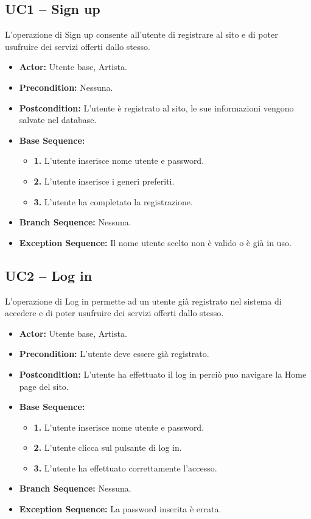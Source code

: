 \subsection{\textbf{UC1 -- Sign up}}
L'operazione di Sign up consente all'utente di registrare al sito 
e di poter usufruire dei servizi offerti dallo stesso. 
\begin{itemize}
    \item \textbf{Actor:} Utente base, Artista.
    \item \textbf{Precondition:} Nessuna.
    \item \textbf{Postcondition:} L'utente è registrato al sito, le sue informazioni vengono salvate nel database.
    \item \textbf{Base Sequence:} 
        \begin{itemize}
            \item \textbf{1.} L'utente inserisce nome utente e password.
            \item \textbf{2.} L'utente inserisce i generi preferiti.
            \item \textbf{3.} L'utente ha completato la registrazione.
        \end{itemize}
    \item \textbf{Branch Sequence:} Nessuna.
    \item \textbf{Exception Sequence:} Il nome utente scelto non è valido o è già in uso.
    
\end{itemize}

\vspace{1cm}
\subsection{\textbf{UC2 -- Log in}}
L'operazione di Log in permette ad un utente già registrato nel sistema di accedere e di poter 
usufruire dei servizi offerti dallo stesso.
\begin{itemize}
    \item \textbf{Actor:} Utente base, Artista.
    \item \textbf{Precondition:} L'utente deve essere già registrato.
    \item \textbf{Postcondition:} L'utente ha effettuato il log in perciò puo navigare la Home page del sito.
    \item \textbf{Base Sequence:}
    \begin{itemize}
        \item \textbf{1.} L'utente inserisce nome utente e password.
        \item \textbf{2.} L'utente clicca sul pulsante di log in.
        \item \textbf{3.} L'utente ha effettuato correttamente l'accesso.
    \end{itemize}
    \item \textbf{Branch Sequence:} Nessuna.
    \item \textbf{Exception Sequence:} La password inserita è errata.
    

\end{itemize}

